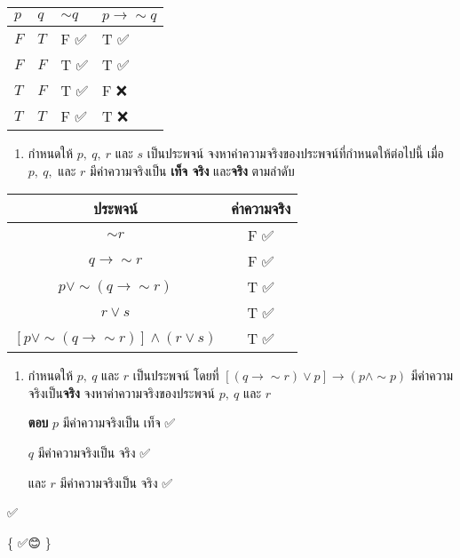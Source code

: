 \documentclass[
  a4paper,
  DIV=11,
  numbers=noendperiod]{scrartcl}
\providecommand{\tightlist}{%
  \setlength{\itemsep}{0pt}\setlength{\parskip}{0pt}}
\begin{document}
\begin{longtable}[]{@{}llll@{}}
\toprule\noalign{}
\(p\) & \(q\) & \(\sim q\) & \(p\rightarrow\sim q\) \\
\midrule\noalign{}
\endhead
\bottomrule\noalign{}
\endlastfoot
\(F\) & \(T\) & F ✅ & T ✅ \\
\(F\) & \(F\) & T ✅ & T ✅ \\
\(T\) & \(F\) & T ✅ & F ❌ \\
\(T\) & \(T\) & F ✅ & T ❌ \\
\end{longtable}

\begin{enumerate}
\def\labelenumi{\arabic{enumi}.}
\setcounter{enumi}{1}
\tightlist
\item
  กำหนดให้ \(p,\ q,\ r\) และ \(s\) เป็นประพจน์
  จงหาค่าความจริงของประพจน์ที่กำหนดให้ต่อไปนี้ เมื่อ \(p,\ q,\) และ \(r\)
  มีค่าความจริงเป็น \textbf{เท็จ จริง} และ\textbf{จริง} ตามลำดับ
\end{enumerate}

\begin{longtable}[]{@{}cc@{}}
\toprule\noalign{}
\textbf{ประพจน์} & \textbf{ค่าความจริง} \\
\midrule\noalign{}
\endhead
\bottomrule\noalign{}
\endlastfoot
\(\sim r\) & F ✅ \\
\(q\rightarrow\sim r\) & F ✅ \\
\(p\lor\sim(q\rightarrow\sim r)\) & T ✅ \\
\(r\lor s\) & T ✅ \\
\([p\lor\sim(q\rightarrow\sim r)]\land(r\lor s)\) & T ✅ \\
\end{longtable}

\newpage

\begin{enumerate}
\def\labelenumi{\arabic{enumi}.}
\setcounter{enumi}{2}
\item
  กำหนดให้ \(p,\ q\) และ \(r\) เป็นประพจน์ โดยที่
  \([(q\rightarrow\sim r)\lor p] \rightarrow (p\land\sim p)\)
  มีค่าความจริงเป็น\textbf{จริง} จงหาค่าความจริงของประพจน์ \(p,\ q\) และ \(r\)

  \textbf{ตอบ} \(p\) มีค่าความจริงเป็น เท็จ ✅

  \(q\) มีค่าความจริงเป็น จริง ✅

  และ \(r\) มีค่าความจริงเป็น จริง ✅
\end{enumerate}

✅

\{ \emojifont ✅😊 \}
\end{document}
